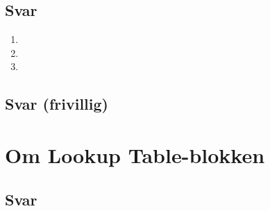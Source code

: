 \documentclass[answers,11pt]{exam}
\begin{document}
\begin{enumerate}[label=\alph*)]
\begin{tcolorbox}
  \end{tcolorbox}

  \newpage
  

  \begin{tcolorbox}
    \subsection*{Svar}

    \begin{enumerate}[label=g\arabic*)]

      \item

      \item

      \item

    \end{enumerate}

  \end{tcolorbox}

  \newpage
  

  \begin{tcolorbox}
    \subsection*{Svar (frivillig)}

  \end{tcolorbox}

  \newpage
  \section*{Om {\sf  Lookup Table}-blokken}

  

  \newpage

  \begin{tcolorbox}
    \subsection*{Svar}


\end{tcolorbox}
\end{enumerate}
\end{document}
